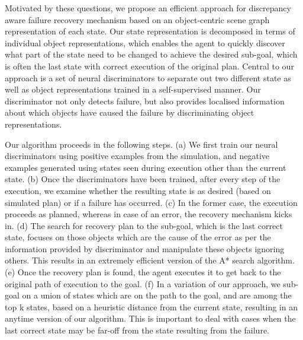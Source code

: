 Motivated by these questions, we propose an efficient approach for discrepancy aware failure recovery mechanism based on an object-centric scene graph representation of each state. Our state representation is decomposed in terms of individual object representations, which enables the agent to quickly discover what part of the state need to be changed to achieve the desired sub-goal, which is often the last state with correct execution of the original plan. Central to our approach is a set of neural discriminators to separate out two different state as well as object representations trained in a self-supervised manner. Our discriminator not only detects failure, but also provides localised information about which objects have caused the failure by discriminating object representations. %

Our algorithm proceeds in the following steps. (a) We first train our neural discriminators using positive examples from the simulation, and negative examples generated using states seen during execution other than the current state. (b) Once the discriminators have been trained, after every step of the execution, we examine whether the resulting state is as desired (based on simulated plan) or if a failure has occurred. (c) In the former case, the execution proceeds as planned, whereas in case of an error, the recovery mechanism kicks in. (d) The search for recovery plan to the sub-goal, which is the last correct state, focuses on those objects which are the cause of the error as per the information provided by discriminator and manipulate these objects ignoring others. This results in an extremely efficient version of the A* search algorithm. (e) Once the recovery plan is found, the agent executes it to get back to the original path of execution to the goal. (f) In a variation of our approach, we sub-goal on a union of states which are on the path to the goal, and are among the top k states, based on a heuristic distance from the current state, resulting in an anytime version of our algorithm.  This is important to deal with cases when the last correct state may be far-off from the state resulting from the failure. 


